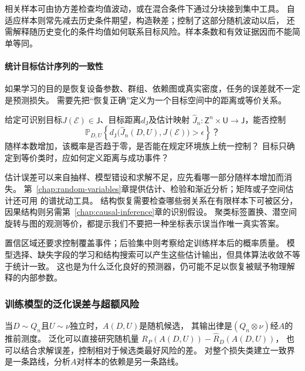 相关样本可由协方差检查均值波动，或在混合条件下通过分块接到集中工具。
自适应样本则常先减去历史条件期望，构造鞅差；控制了这部分随机波动以后，
还需解释随历史变化的条件均值如何联系目标风险。样本条数和有效证据因而不能简单等同。

\paragraph{统计目标估计序列的一致性}
\label{sec:future-analysis-statistical-recovery}

如果学习的目的是恢复设备参数、群组、依赖图或真实密度，任务的误差就不一定是预测损失。
需要先把“恢复正确”定义为一个目标空间中的距离或等价关系。

\begin{mathproblem}[估计映射的恢复误差与统计一致性]
  \label{question:future-statistical-recovery}
  给定可识别目标$J(\mathcal E)\in\mathsf J$、目标距离$d_{\mathsf J}$及估计映射
  $\widehat J_n:\mathsf Z^n\times\mathsf U\to\mathsf J$，能否控制
  \[
    \mathbb P_{D,U}\!\left\{
      d_{\mathsf J}\bigl(\widehat J_n(D,U),J(\mathcal E)\bigr)>\epsilon
    \right\}\text{？}
  \]
  随样本数增加，该概率是否趋于零，是否能在规定环境族上统一控制？
  目标只确定到等价类时，应如何定义距离与成功事件？
\end{mathproblem}

估计误差可以来自抽样、模型错设和求解不足，应先看哪一部分随样本增加而消失。
第~\ref{chap:random-variables}章提供估计、检验和渐近分析；矩阵或子空间估计还可用
的谱扰动工具。
结构恢复需要检查哪些弱关系在有限样本下可被区分，因果结构则另需第~\ref{chap:causal-inference}章的识别假设。
聚类标签置换、潜空间旋转与图的观测等价，都提示我们不要把一种坐标表示误当作唯一真实答案。

置信区域还要求控制覆盖事件；后验集中则考察给定训练样本后的概率质量。
模型选择、缺失字段的学习和结构搜索可以产生这些估计输出，但具体算法收敛不等于统计一致。
这也是为什么泛化良好的预测器，仍可能不足以恢复被赋予物理解释的内部参数。

\subsubsection{训练模型的泛化误差与超额风险}
\label{sec:future-analysis-learned-risk}

当$D\sim Q_n$且$U\sim\nu$独立时，$A(D,U)$是随机候选，
其输出律是$(Q_n\otimes\nu)$经$A$的推前测度。
泛化可以直接研究随机量
$R_P(A(D,U))-\widehat R_D(A(D,U))$，
也可以结合求解误差，控制相对于候选类最好风险的差。
对整个损失类建立一致界是一条路线，分析$A$对样本的依赖是另一条路线。

